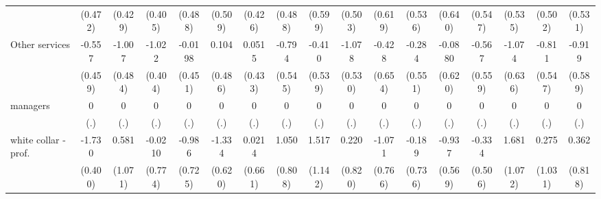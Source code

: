 {\begin{tabular}{l*{16}{c}}
                    &     (0.472)         &     (0.429)         &     (0.405)         &     (0.488)         &     (0.509)         &     (0.426)         &     (0.488)         &     (0.599)         &     (0.503)         &     (0.619)         &     (0.536)         &     (0.640)         &     (0.547)         &     (0.535)         &     (0.502)         &     (0.531)         \\
[1em]
Other services      &      -0.557         &      -1.007\sym{*}  &      -1.022\sym{*}  &     -0.0198         &       0.104         &      0.0515         &      -0.794         &      -0.410         &      -1.078\sym{*}  &      -0.428         &      -0.284         &     -0.0880         &      -0.567         &      -1.074         &      -0.811         &      -0.919         \\
                    &     (0.459)         &     (0.484)         &     (0.404)         &     (0.451)         &     (0.486)         &     (0.433)         &     (0.545)         &     (0.539)         &     (0.530)         &     (0.654)         &     (0.551)         &     (0.620)         &     (0.559)         &     (0.636)         &     (0.547)         &     (0.589)         \\
[1em]
managers            &           0         &           0         &           0         &           0         &           0         &           0         &           0         &           0         &           0         &           0         &           0         &           0         &           0         &           0         &           0         &           0         \\
                    &         (.)         &         (.)         &         (.)         &         (.)         &         (.)         &         (.)         &         (.)         &         (.)         &         (.)         &         (.)         &         (.)         &         (.)         &         (.)         &         (.)         &         (.)         &         (.)         \\
[1em]
white collar - prof.&      -1.730\sym{***}&       0.581         &     -0.0210         &      -0.986         &      -1.334\sym{*}  &      0.0214         &       1.050         &       1.517         &       0.220         &      -1.071         &      -0.189         &      -0.937         &      -0.334         &       1.681         &       0.275         &       0.362         \\
                    &     (0.400)         &     (1.071)         &     (0.774)         &     (0.725)         &     (0.620)         &     (0.661)         &     (0.808)         &     (1.142)         &     (0.820)         &     (0.766)         &     (0.736)         &     (0.569)         &     (0.506)         &     (1.072)         &     (1.031)         &     (0.818)         \\

\end{tabular}}

